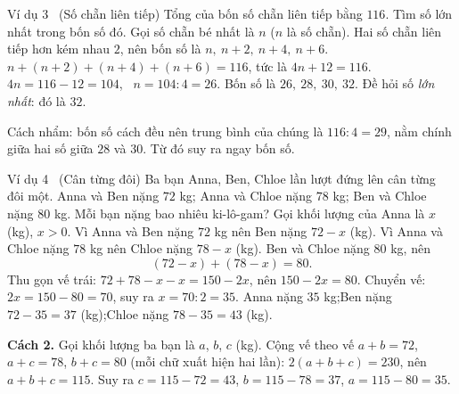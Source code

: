 \begin{exbox}{Ví dụ 3 \ (Số chẵn liên tiếp)}
Tổng của bốn số chẵn liên tiếp bằng $116$. Tìm số lớn nhất trong bốn số đó.
\guide
{}
Gọi số chẵn bé nhất là $n$ ($n$ là số chẵn). Hai số chẵn liên tiếp hơn kém nhau $2$, nên bốn số là
$n,\ n+2,\ n+4,\ n+6$.
$n+(n+2)+(n+4)+(n+6)=116$, tức là $4n+12=116$.
$4n=116-12=104$, \ $n=104:4=26$. Bốn số là $26,\ 28,\ 30,\ 32$.
Đề hỏi số \emph{lớn nhất}: đó là $32$.
\begin{tipbox}Cách nhẩm: bốn số cách đều nên trung bình của chúng là $116:4=29$, nằm chính giữa hai số giữa $28$ và $30$. Từ đó suy ra ngay bốn số.\end{tipbox}
\end{exbox}

\begin{exbox}{Ví dụ 4 \ (Cân từng đôi)}
Ba bạn Anna, Ben, Chloe lần lượt đứng lên cân từng đôi một. Anna và Ben nặng $72$ kg; Anna và Chloe nặng $78$ kg;
Ben và Chloe nặng $80$ kg. Mỗi bạn nặng bao nhiêu ki-lô-gam?
\guide
{}
Gọi khối lượng của Anna là $x$ (kg), $x>0$.
Vì Anna và Ben nặng $72$ kg nên Ben nặng $72-x$ (kg).
Vì Anna và Chloe nặng $78$ kg nên Chloe nặng $78-x$ (kg).
Ben và Chloe nặng $80$ kg, nên
\[(72-x)+(78-x)=80.\]
Thu gọn vế trái: $72+78-x-x=150-2x$, nên $150-2x=80$. Chuyển vế: $2x=150-80=70$, suy ra $x=70:2=35$.
Anna nặng $35$ kg;\quad Ben nặng $72-35=37$ (kg);\quad Chloe nặng $78-35=43$ (kg).
\begin{tipbox}\textbf{Cách 2.} Gọi khối lượng ba bạn là $a$, $b$, $c$ (kg). Cộng vế theo vế $a+b=72$, $a+c=78$, $b+c=80$ (mỗi chữ xuất hiện hai lần): $2(a+b+c)=230$, nên $a+b+c=115$. Suy ra $c=115-72=43$, $b=115-78=37$, $a=115-80=35$.\end{tipbox}
\end{exbox}

